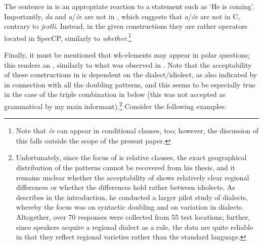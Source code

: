 \documentclass[output=paper,modfonts, hidelinks, newtxmath]{langscibook}
\begin{document}
 
\noindent The sentence in  is an appropriate reaction to a statement such as `He is coming'. Importantly, \textit{da} and \textit{a}/\textit{če} are not in , which suggests that \textit{a}/\textit{če} are not in C, contrary to  \textit{jestli}. Instead, in the given constructions they are rather operators located in SpecCP, similarly to  \textit{whether}.\footnote{Note that \textit{če} can appear in conditional clauses, too; however, the discussion of this falls outside the scope of the present paper.}

\largerpage[-2]
Finally, it must be mentioned that wh-elements may appear in polar questions; this renders an , similarly to what was observed in . Note that the acceptability of these constructions in  is dependent on the dialect/idiolect, as also indicated by \citet{hladnik2010} in connection with all the doubling patterns, and this seems to be especially true in the case of the triple combination in  below (this was not accepted as grammatical by my main informant).\footnote{Unfortunately, since the focus of \citet{hladnik2010} is relative clauses, the exact geographical distribution of the  patterns cannot be recovered from his thesis, and it remains unclear whether the acceptability of  shows relatively clear regional differences or whether the differences hold rather between idiolects. As \citet[6--8]{hladnik2010} describes in the introduction, he conducted a larger pilot study of  dialects, whereby the focus was on syntactic doubling and on variation in dialects. Altogether, over 70 responses were collected from 55 test locations; further, since  speakers acquire a regional dialect as a rule, the data are quite reliable in that they reflect regional varieties rather than the standard language.} Consider the following examples:

\ea \label{polarecho}
	\z
\z
\end{document}
